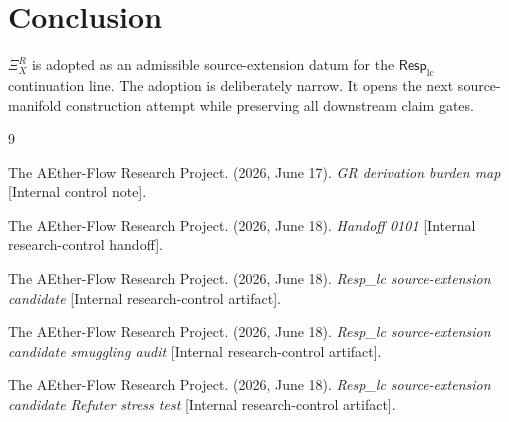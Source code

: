 \documentclass[11pt]{article}
\newcommand{\RespLC}{\mathsf{Resp}_{\mathrm{lc}}}
\newcommand{\XiR}{\Xi_X^R}
\begin{document}
\section{Conclusion}

\(\XiR\) is adopted as an admissible source-extension datum for the
\(\RespLC\) continuation line. The adoption is deliberately narrow. It
opens the next source-manifold construction attempt while preserving all
downstream claim gates.

\begin{thebibliography}{9}

The AEther-Flow Research Project. (2026, June 17). \emph{GR derivation
burden map} [Internal control note].

The AEther-Flow Research Project. (2026, June 18). \emph{Handoff 0101}
[Internal research-control handoff].

The AEther-Flow Research Project. (2026, June 18). \emph{Resp\_lc
source-extension candidate} [Internal research-control artifact].

The AEther-Flow Research Project. (2026, June 18). \emph{Resp\_lc
source-extension candidate smuggling audit} [Internal research-control
artifact].

The AEther-Flow Research Project. (2026, June 18). \emph{Resp\_lc
source-extension candidate Refuter stress test} [Internal research-control
artifact].

\end{thebibliography}
\end{document}
